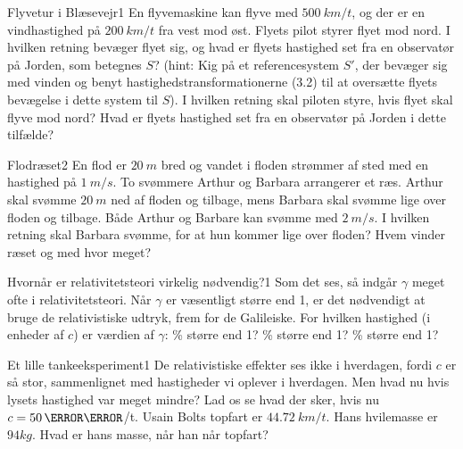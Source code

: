\begin{opgave}{Flyvetur i Blæsevejr}{1}
En flyvemaskine kan flyve med  $\SI{500}{km/t}$, og der er en vindhastighed på $\SI{200}{km/t}$ fra vest mod øst.
\opg Flyets pilot styrer flyet mod nord. I hvilken retning bevæger flyet sig, og hvad er flyets hastighed set fra en observatør på Jorden, som betegnes $S$? (hint: Kig på et referencesystem $S'$, der bevæger sig med vinden og benyt hastighedstransformationerne (3.2) til at oversætte flyets bevægelse i dette system til $S$).
\opg I hvilken retning skal piloten styre, hvis flyet skal flyve mod nord? Hvad er flyets hastighed set fra en observatør på Jorden i dette tilfælde?
\end{opgave}

\begin{opgave}{Flodræset}{2}
En flod er $\SI{20}{m}$ bred og vandet i floden strømmer af sted med en hastighed på $\SI{1}{m/s}$. To svømmere Arthur og Barbara arrangerer et ræs. Arthur skal svømme $\SI{20}{m}$ ned af floden og tilbage, mens Barbara skal svømme lige over floden og tilbage. Både Arthur og Barbare kan svømme med $\SI{2}{m/s}$.
\opg I hvilken retning skal Barbara svømme, for at hun kommer lige over floden?
\opg Hvem vinder ræset og med hvor meget?
\end{opgave}

\begin{opgave}{Hvornår er relativitetsteori virkelig nødvendig?}{1}
	Som det ses, så indgår $\gamma$ meget ofte i relativitetsteori. Når $\gamma$ er væsentligt større end 1, er det
	nødvendigt at bruge de relativistiske udtryk, frem for de Galileiske. For hvilken hastighed (i enheder af $c$) er
	værdien af $\gamma$:
	\% større end 1?
	\% større end 1?
	\% større end 1?
\end{opgave}

\begin{opgave}{Et lille tankeeksperiment}{1}
	De relativistiske effekter ses ikke i hverdagen, fordi $c$ er så stor, sammenlignet med hastigheder vi oplever i
	hverdagen. Men hvad nu hvis lysets hastighed var meget mindre? Lad os se hvad der sker, hvis nu $c = 50\,\kilo\meter$/t.
	\opg Usain Bolts topfart er $\SI{44,72}{km/t}$. Hans hvilemasse er $94 \si{kg}$. Hvad er hans masse, når han når
	topfart?
\end{opgave}

